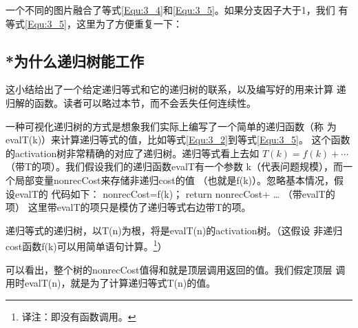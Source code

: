 一个不同的图片融合了等式\ref{Equ:3_4}和\ref{Equ:3_5}。如果分支因子大于1，我们
有等式\ref{Equ:3_5}，这里为了方便重复一下：

\subsection{*为什么递归树能工作}\label{Sec:WhyCanRecursiveTreeWork}
这小结给出了一个给定递归等式和它的递归树的联系，以及编写好的用来计算
递归解的函数。读者可以略过本节，而不会丢失任何连续性。

一种可视化递归树的方式是想象我们实际上编写了一个简单的递归函数（称
为evalT(k)）来计算递归等式的值，比如等式\ref{Equ:3_2}到等式\ref{Equ:3_5}。
这个函数的activation树非常精确的对应了递归树。递归等式看上去如
$T(k)=f(k)+\cdots $（带T的项）。我们假设我们的递归函数evalT有一个参数
k（代表问题规模），而一个局部变量nonrecCost来存储非递归cost的值
（也就是f(k)）。忽略基本情况，假设evalT的
代码如下：
\indent   nonrecCost=f(k)；
\indent   return nonrecCost+ … （带evalT的项）
这里带evalT的项只是模仿了递归等式右边带T的项。

递归等式的递归树，以T(n)为根，将是evalT(n)的activation树。（这假设
非递归cost函数f(k)可以用简单语句计算。\footnote{译注：即没有函数调用。}）

可以看出，整个树的nonrecCost值得和就是顶层调用返回的值。我们假定顶层
调用时evalT(n)，就是为了计算递归等式T(n)的值。
